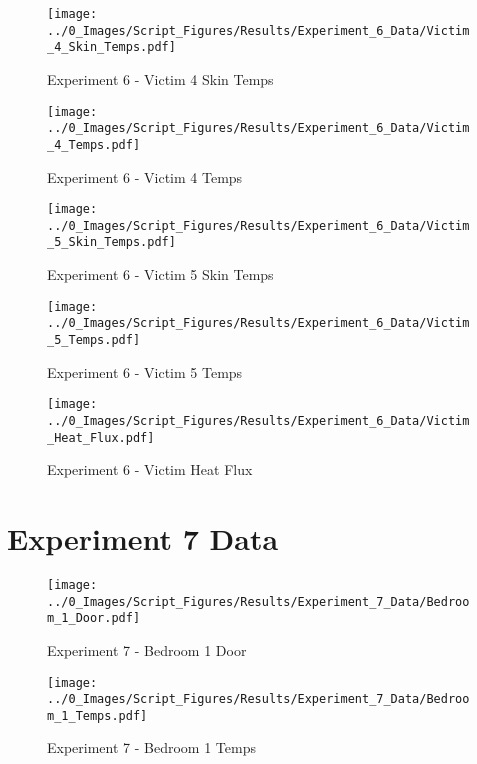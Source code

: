 	\begin{figure}[H]
		\centering
		\texttt{[image: ../0\_Images/Script\_Figures/Results/Experiment\_6\_Data/Victim\_4\_Skin\_Temps.pdf]}
		\caption[]{Experiment 6 - Victim 4 Skin Temps}
	\end{figure}
 
	\clearpage

	\begin{figure}[H]
		\centering
		\texttt{[image: ../0\_Images/Script\_Figures/Results/Experiment\_6\_Data/Victim\_4\_Temps.pdf]}
		\caption[]{Experiment 6 - Victim 4 Temps}
	\end{figure}
 

	\begin{figure}[H]
		\centering
		\texttt{[image: ../0\_Images/Script\_Figures/Results/Experiment\_6\_Data/Victim\_5\_Skin\_Temps.pdf]}
		\caption[]{Experiment 6 - Victim 5 Skin Temps}
	\end{figure}
 
	\clearpage

	\begin{figure}[H]
		\centering
		\texttt{[image: ../0\_Images/Script\_Figures/Results/Experiment\_6\_Data/Victim\_5\_Temps.pdf]}
		\caption[]{Experiment 6 - Victim 5 Temps}
	\end{figure}
 

	\begin{figure}[H]
		\centering
		\texttt{[image: ../0\_Images/Script\_Figures/Results/Experiment\_6\_Data/Victim\_Heat\_Flux.pdf]}
		\caption[]{Experiment 6 - Victim Heat Flux}
	\end{figure}
 
	\clearpage

\clearpage		\large
\section{Experiment 7 Data} \label{App:Exp7Results} 

	\begin{figure}[H]
		\centering
		\texttt{[image: ../0\_Images/Script\_Figures/Results/Experiment\_7\_Data/Bedroom\_1\_Door.pdf]}
		\caption[]{Experiment 7 - Bedroom 1 Door}
	\end{figure}
 

	\begin{figure}[H]
		\centering
		\texttt{[image: ../0\_Images/Script\_Figures/Results/Experiment\_7\_Data/Bedroom\_1\_Temps.pdf]}
		\caption[]{Experiment 7 - Bedroom 1 Temps}
	\end{figure}
 
